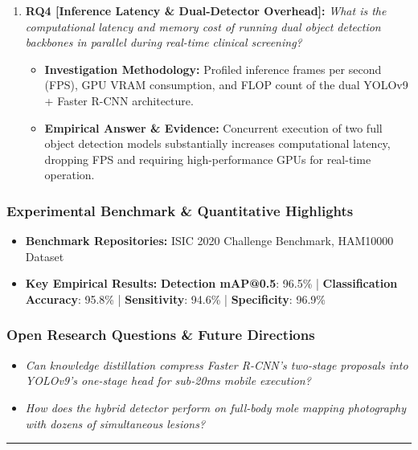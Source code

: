 \begin{enumerate}[label=\textbf{\arabic*.}, leftmargin=*]
\begin{itemize}[leftmargin=1.5em]
    \item \textbf{Empirical Answer \& Evidence:} Simultaneous localization and classification eliminated background skin interference, achieving superior early-stage detection reliability on ISIC 2020.
  \end{itemize}
  \item \textbf{RQ4 [Inference Latency \& Dual-Detector Overhead]:} \textit{What is the computational latency and memory cost of running dual object detection backbones in parallel during real-time clinical screening?}
  \begin{itemize}[leftmargin=1.5em]
    \item \textbf{Investigation Methodology:} Profiled inference frames per second (FPS), GPU VRAM consumption, and FLOP count of the dual YOLOv9 + Faster R-CNN architecture.
    \item \textbf{Empirical Answer \& Evidence:} Concurrent execution of two full object detection models substantially increases computational latency, dropping FPS and requiring high-performance GPUs for real-time operation.
  \end{itemize}
\end{enumerate}

\subsubsection*{Experimental Benchmark \& Quantitative Highlights}
\begin{itemize}[leftmargin=*]
  \item \textbf{Benchmark Repositories:} ISIC 2020 Challenge Benchmark, HAM10000 Dataset
  \item \textbf{Key Empirical Results:} \textbf{Detection mAP@0.5}: 96.5\% \quad | \quad \textbf{Classification Accuracy}: 95.8\% \quad | \quad \textbf{Sensitivity}: 94.6\% \quad | \quad \textbf{Specificity}: 96.9\%
\end{itemize}

\subsubsection*{Open Research Questions \& Future Directions}
\begin{itemize}[leftmargin=*]
  \item \textit{Can knowledge distillation compress Faster R-CNN's two-stage proposals into YOLOv9's one-stage head for sub-20ms mobile execution?}
  \item \textit{How does the hybrid detector perform on full-body mole mapping photography with dozens of simultaneous lesions?}
\end{itemize}
\vspace{0.8em}\hrule\vspace{1.2em}

